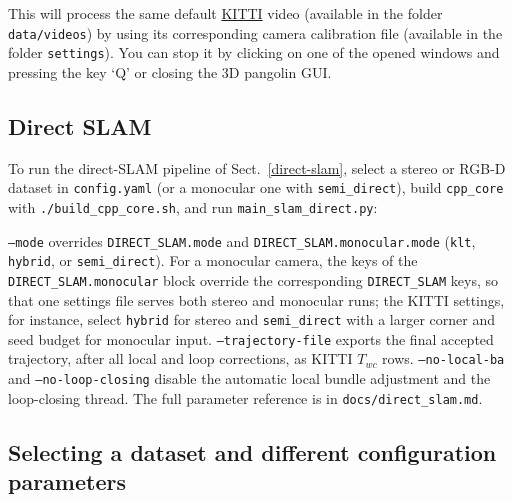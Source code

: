 \documentclass{article}
\newenvironment{Shaded}{\begin{snugshade}}{\end{snugshade}}
\newcommand{\AttributeTok}[1]{\textcolor[rgb]{0.74,0.68,0.62}{#1}}
\newcommand{\ExtensionTok}[1]{\textcolor[rgb]{0.74,0.68,0.62}{#1}}
\newcommand{\NormalTok}[1]{\textcolor[rgb]{0.74,0.68,0.62}{#1}}
\begin{document}
This will process the same default
\href{http://www.cvlibs.net/datasets/kitti/eval_odometry.php}{KITTI}
video (available in the folder \texttt{data/videos}) by using its
corresponding camera calibration file (available in the folder
\texttt{settings}). You can stop it by clicking on one of the
opened windows and pressing the key `Q' or closing the 3D pangolin GUI.

\hypertarget{direct-slam-usage}{%
\subsection{Direct SLAM}\label{direct-slam-usage}}

To run the direct-SLAM pipeline of Sect.~\ref{direct-slam}, select a stereo or RGB-D dataset in \texttt{config.yaml} (or a monocular one with \texttt{semi\_direct}), build \texttt{cpp\_core} with \texttt{./build\_cpp\_core.sh}, and run \texttt{main\_slam\_direct.py}:\\

\begin{scriptsize}
\begin{Shaded}
\end{Shaded}
\end{scriptsize}

\texttt{--mode} overrides \texttt{DIRECT\_SLAM.mode} and \texttt{DIRECT\_SLAM.monocular.mode} (\texttt{klt}, \texttt{hybrid}, or \texttt{semi\_direct}). For a monocular camera, the keys of the \texttt{DIRECT\_SLAM.monocular} block override the corresponding \texttt{DIRECT\_SLAM} keys, so that one settings file serves both stereo and monocular runs; the KITTI settings, for instance, select \texttt{hybrid} for stereo and \texttt{semi\_direct} with a larger corner and seed budget for monocular input. \texttt{--trajectory-file} exports the final accepted trajectory, after all local and loop corrections, as KITTI $T_{wc}$ rows. \texttt{--no-local-ba} and \texttt{--no-loop-closing} disable the automatic local bundle adjustment and the loop-closing thread. The full parameter reference is in \texttt{docs/direct\_slam.md}.
\hypertarget{selecting-a-dataset-and-different-configuration-parameters}{%
\subsection{Selecting a dataset and different configuration
parameters}\label{selecting-a-dataset-and-different-configuration-parameters}}
\end{document}
